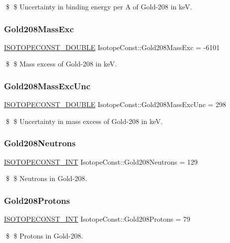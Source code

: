 \$ \$ Uncertainty in binding energy per A of Gold-\/208 in keV. \mbox{\label{group___isotope_const-_gold-_au208_gae021e357bedd2d02ab93cdc083591848}} 
\subsubsection{\texorpdfstring{Gold208\+Mass\+Exc}{Gold208MassExc}}
{\footnotesize\ttfamily \mbox{\hyperlink{group___isotope_const-_macros_ga8f45a7272ce02c0b4c65c44636ed719a}{I\+S\+O\+T\+O\+P\+E\+C\+O\+N\+S\+T\+\_\+\+D\+O\+U\+B\+LE}} Isotope\+Const\+::\+Gold208\+Mass\+Exc = -\/6101}

\$ \$ Mass excess of Gold-\/208 in keV. \mbox{\label{group___isotope_const-_gold-_au208_gaf237e63670e783589caa4f441fe01bcb}} 
\subsubsection{\texorpdfstring{Gold208\+Mass\+Exc\+Unc}{Gold208MassExcUnc}}
{\footnotesize\ttfamily \mbox{\hyperlink{group___isotope_const-_macros_ga8f45a7272ce02c0b4c65c44636ed719a}{I\+S\+O\+T\+O\+P\+E\+C\+O\+N\+S\+T\+\_\+\+D\+O\+U\+B\+LE}} Isotope\+Const\+::\+Gold208\+Mass\+Exc\+Unc = 298}

\$ \$ Uncertainty in mass excess of Gold-\/208 in keV. \mbox{\label{group___isotope_const-_gold-_au208_ga078e968af00e59fe4e3133a36c6d422d}} 
\subsubsection{\texorpdfstring{Gold208\+Neutrons}{Gold208Neutrons}}
{\footnotesize\ttfamily \mbox{\hyperlink{group___isotope_const-_macros_ga5f18360b3e99483a35c32d789e62621c}{I\+S\+O\+T\+O\+P\+E\+C\+O\+N\+S\+T\+\_\+\+I\+NT}} Isotope\+Const\+::\+Gold208\+Neutrons = 129}

\$ \$ Neutrons in Gold-\/208. \mbox{\label{group___isotope_const-_gold-_au208_ga4ad7c8f54a56e5ddab6167d433cb6fe3}} 
\subsubsection{\texorpdfstring{Gold208\+Protons}{Gold208Protons}}
{\footnotesize\ttfamily \mbox{\hyperlink{group___isotope_const-_macros_ga5f18360b3e99483a35c32d789e62621c}{I\+S\+O\+T\+O\+P\+E\+C\+O\+N\+S\+T\+\_\+\+I\+NT}} Isotope\+Const\+::\+Gold208\+Protons = 79}

\$ \$ Protons in Gold-\/208. 